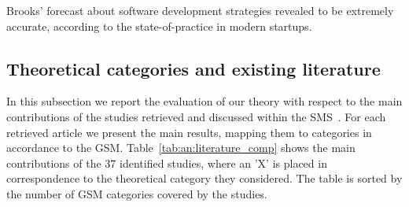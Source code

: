 \documentclass[10pt,journal,letterpaper,compsoc]{IEEEtran}
\begin{document}
Brooks' forecast about software development strategies revealed to be
extremely accurate, according to the state-of-practice in modern startups.

\subsection{Theoretical categories and existing literature}
\label{sect:theory:validation:sms}

In this subsection we report the evaluation of our theory with respect to the
main contributions of the studies retrieved and discussed within the 
SMS~\cite{SMS}. For each retrieved article we present the main results, mapping 
them to categories in accordance to the GSM. 
Table~\ref{tab:an:literature_comp} shows the main contributions of the 37 
identified studies, where an 'X' is placed in correspondence to the theoretical 
category they considered. The table is sorted by the number of GSM categories 
covered by the studies.
\end{document}
